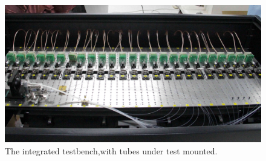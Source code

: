 \documentclass[5p, times]{elsarticle}
\begin{document}
\begin{figure}[t]
 \centering
 \includegraphics[width=140mm]{integration1_crop}
\caption{The integrated testbench,with tubes under test mounted.}
\label{fig:testbench_integrated}
\end{figure}
  
\end{document}
